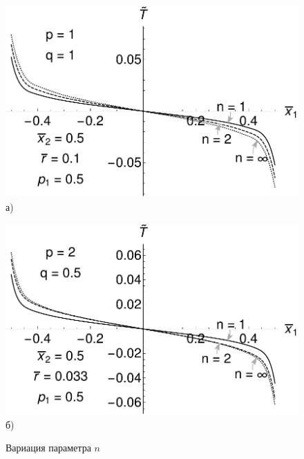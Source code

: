\begin{figure}[ht]
    \begin{minipage}[b][][b]{0.49\linewidth}\centering
        \includegraphics[width=\linewidth]{pics/TPolyInfluenceVariationN.pdf} \\ а)
    \end{minipage}
    \hfill
    \begin{minipage}[b][][b]{0.49\linewidth}\centering
        \includegraphics[width=\linewidth]{pics/TExpInfluenceVariationN.pdf} \\ б)
    \end{minipage}
    \caption{Вариация параметра $n$}
    \label{fig:InfluenceVariationN}
\end{figure}


